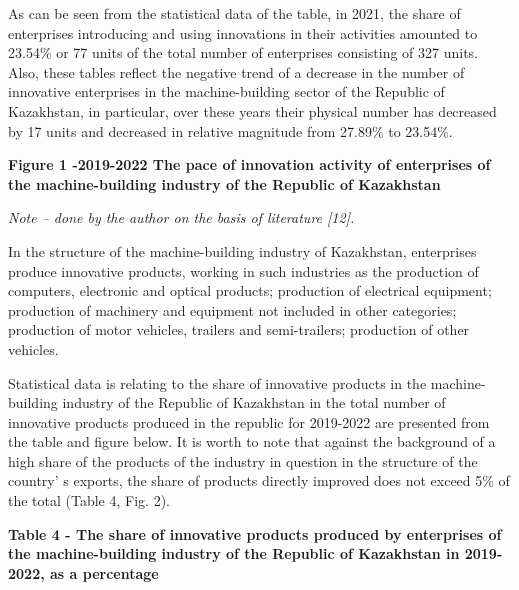 As can be seen from the statistical data of the table, in 2021, the
share of enterprises introducing and using innovations in their
activities amounted to 23.54\% or 77 units of the total number of
enterprises consisting of 327 units. Also, these tables reflect the
negative trend of a decrease in the number of innovative enterprises in
the machine-building sector of the Republic of Kazakhstan, in
particular, over these years their physical number has decreased by 17
units and decreased in relative magnitude from 27.89\% to 23.54\%.

{\bfseries Figure 1 -2019-2022 The pace of innovation activity of
enterprises of the machine-building industry of the Republic of
Kazakhstan}

\emph{Note -- done by the author on the basis of literature {[}12{]}.}

In the structure of the machine-building industry of Kazakhstan,
enterprises produce innovative products, working in such industries as
the production of computers, electronic and optical products; production
of electrical equipment; production of machinery and equipment not
included in other categories; production of motor vehicles, trailers and
semi-trailers; production of other vehicles.

Statistical data is relating to the share of innovative products in the
machine-building industry of the Republic of Kazakhstan in the total
number of innovative products produced in the republic for 2019-2022 are
presented from the table and figure below. It is worth to note that
against the background of a high share of the products of the industry
in question in the structure of the country' s exports,
the share of products directly improved does not exceed 5\% of the total
(Table 4, Fig. 2).

{\bfseries Table 4 - The share of innovative products produced by
enterprises of the machine-building industry of the Republic of
Kazakhstan in 2019-2022, as a percentage}


